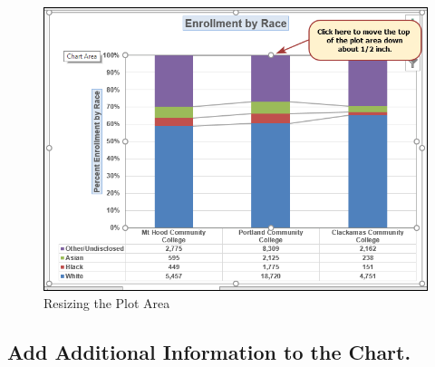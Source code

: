 \begin{figure}[H]
	\centering
	\includegraphics[width=\maxwidth{.95\linewidth}]{gfx/ch04_fig42}
	\caption{Resizing the Plot Area}
	\label{04:fig42}
\end{figure}

\subsection{Add Additional Information to the Chart.}

